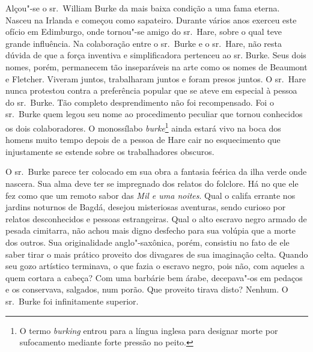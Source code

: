 Alçou"-se o sr.~William Burke da mais baixa condição a uma fama eterna.
Nasceu na Irlanda e começou como sapateiro. Durante vários anos exerceu
este ofício em Edimburgo, onde tornou"-se amigo do sr.~Hare, sobre o qual
teve grande influência. Na colaboração entre o sr.~Burke e o sr.~Hare, não
resta dúvida de que a força inventiva e simplificadora pertenceu ao sr.
Burke. Seus dois nomes, porém, permanecem tão inseparáveis na arte como os
nomes de Beaumont e Fletcher. Viveram juntos, trabalharam juntos e foram
presos juntos. O sr.~Hare nunca protestou contra a preferência popular que
se ateve em especial à pessoa do sr.~Burke. Tão completo desprendimento
não foi recompensado. Foi o sr.~Burke quem legou seu nome ao procedimento
peculiar que tornou conhecidos os dois colaboradores. O monossílabo
\textit{burke}\footnote{ O termo \textit{burking} entrou para a língua
inglesa para designar morte por sufocamento mediante forte pressão no peito.} 
ainda estará vivo na boca dos homens muito tempo depois de
a pessoa de Hare cair no esquecimento que injustamente se estende sobre os
trabalhadores obscuros.

O sr.~Burke parece ter colocado em sua obra a fantasia feérica da ilha
verde onde nascera. Sua alma deve ter se impregnado dos relatos do
folclore. Há no que ele fez como que um remoto sabor das \textit{Mil e uma
noites}. Qual o califa errante nos jardins noturnos de Bagdá, desejou
misteriosas aventuras, sendo curioso por relatos desconhecidos e pessoas
estrangeiras. Qual o alto escravo negro armado de pesada cimitarra, não
achou mais digno desfecho para sua volúpia que a morte dos outros. Sua
originalidade anglo"-saxônica, porém, consistiu no fato de ele saber tirar
o mais prático proveito dos divagares de sua imaginação celta. Quando seu
gozo artístico terminava, o que fazia o escravo negro, pois não, com
aqueles a quem cortara a cabeça? Com uma barbárie bem árabe, decepava"-os
em pedaços e os conservava, salgados, num porão. Que proveito tirava
disto? Nenhum. O sr.~Burke foi infinitamente superior.

